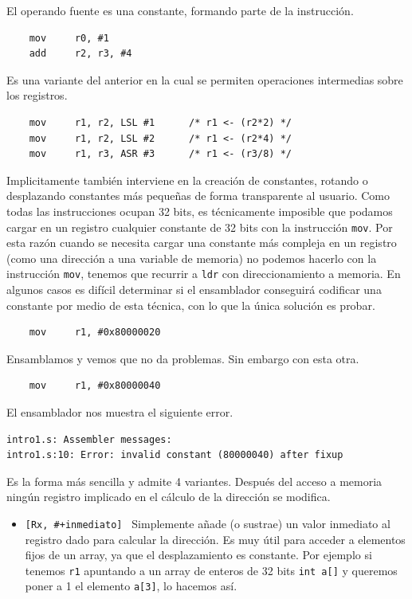 \begin{descript}
  \item[Direccionamiento inmediato.]
    El operando fuente es una constante, formando parte de la instrucción.
\begin{lstlisting}
    mov     r0, #1
    add     r2, r3, #4
\end{lstlisting}
  \item[Direccionamiento inmediato con desplazamiento o rotación.]
    Es una variante del anterior en la cual se permiten operaciones intermedias
    sobre los registros.
\begin{lstlisting}
    mov     r1, r2, LSL #1      /* r1 <- (r2*2) */
    mov     r1, r2, LSL #2      /* r1 <- (r2*4) */
    mov     r1, r3, ASR #3      /* r1 <- (r3/8) */
\end{lstlisting}
    Implicitamente también interviene en la creación de constantes, rotando o
    desplazando constantes más pequeñas de forma transparente al usuario. Como todas
    las instrucciones ocupan 32 bits, es técnicamente imposible que podamos cargar
    en un registro cualquier constante de 32 bits con la instrucción {\tt mov}. Por
    esta razón cuando se necesita cargar una constante más compleja en un registro
    (como una dirección a una variable de memoria) no podemos hacerlo con la instrucción
    {\tt mov}, tenemos que recurrir a {\tt ldr} con direccionamiento a memoria. En algunos
    casos es difícil determinar si el ensamblador conseguirá codificar una constante
    por medio de esta técnica, con lo que la única solución es probar.
\begin{lstlisting}
    mov     r1, #0x80000020
\end{lstlisting}
    Ensamblamos y vemos que no da problemas. Sin embargo con esta otra.
\begin{lstlisting}
    mov     r1, #0x80000040
\end{lstlisting}
    El ensamblador nos muestra el siguiente error.
\begin{lstlisting}
intro1.s: Assembler messages:
intro1.s:10: Error: invalid constant (80000040) after fixup
\end{lstlisting}

  \item[Direccionamiento a memoria, sin actualizar registro puntero.]
    Es la forma más sencilla y admite 4 variantes. Después del acceso
    a memoria ningún registro implicado en el cálculo de la dirección
    se modifica.
\begin{itemize}
  \item{\tt [Rx, \#+inmediato] \newline
            [Rx, \#-inmediato] \newline}
    Simplemente añade (o sustrae) un valor inmediato al registro dado
    para calcular la dirección. Es muy útil para acceder a elementos
    fijos de un array, ya que el desplazamiento es constante. Por
    ejemplo si tenemos {\tt r1} apuntando a un array de enteros de
    32 bits {\tt int a[]} y queremos poner a 1 el
    elemento {\tt a[3]}, lo hacemos así.


\end{itemize}
\end{descript}
